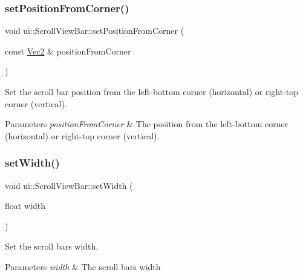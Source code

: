 \subsubsection{\texorpdfstring{set\+Position\+From\+Corner()}{setPositionFromCorner()}\hspace{0.1cm}{\footnotesize\ttfamily [2/2]}}
{\footnotesize\ttfamily void ui\+::\+Scroll\+View\+Bar\+::set\+Position\+From\+Corner (\begin{DoxyParamCaption}\item[{const \hyperlink{classVec2}{Vec2} \&}]{position\+From\+Corner }\end{DoxyParamCaption})}



Set the scroll bar position from the left-\/bottom corner (horizontal) or right-\/top corner (vertical). 


\begin{DoxyParams}{Parameters}
{\em position\+From\+Corner} & The position from the left-\/bottom corner (horizontal) or right-\/top corner (vertical). \\
\hline
\end{DoxyParams}
\mbox{\label{classui_1_1ScrollViewBar_aad9c46e5d319dcc2737af241753fc0b0}} 
\subsubsection{\texorpdfstring{set\+Width()}{setWidth()}\hspace{0.1cm}{\footnotesize\ttfamily [1/2]}}
{\footnotesize\ttfamily void ui\+::\+Scroll\+View\+Bar\+::set\+Width (\begin{DoxyParamCaption}\item[{float}]{width }\end{DoxyParamCaption})}



Set the scroll bar\textquotesingle{}s width. 


\begin{DoxyParams}{Parameters}
{\em width} & The scroll bar\textquotesingle{}s width \\
\hline
\end{DoxyParams}
\mbox{\label{classui_1_1ScrollViewBar_aad9c46e5d319dcc2737af241753fc0b0}} 
